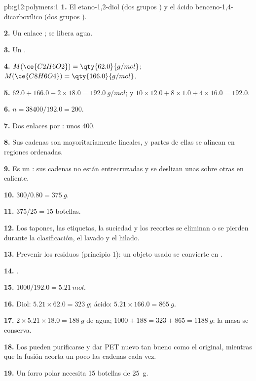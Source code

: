 \begin{solution}{pb:g12:polymers:1}
\textbf{1.} El etano-1,2-diol (dos grupos ) y el ácido
benceno-1,4-dicarboxílico (dos grupos ).

\textbf{2.} Un enlace ; se libera agua.

\textbf{3.} Un .

\textbf{4.} $M(\ce{C2H6O2}) = \qty{62.0}{g/mol}$; $M(\ce{C8H6O4}) =
\qty{166.0}{g/mol}$.

\textbf{5.} $62.0 + 166.0 - 2 \times 18.0 = \qty{192.0}{g/mol}$; y
$10 \times 12.0 + 8 \times 1.0 + 4 \times 16.0 = 192.0$.

\textbf{6.} $n = 38400/192.0 = 200$.

\textbf{7.} Dos enlaces  por : unos 400.

\textbf{8.} Sus cadenas son mayoritariamente lineales, y partes de ellas
se alinean en regiones ordenadas.

\textbf{9.} Es un : sus cadenas no están entrecruzadas y se
deslizan unas sobre otras en caliente.

\textbf{10.} $300/0.80 = \qty{375}{g}$.

\textbf{11.} $375/25 = 15$ botellas.

\textbf{12.} Los tapones, las etiquetas, la suciedad y los recortes se
eliminan o se pierden durante la clasificación, el lavado y el hilado.

\textbf{13.} Prevenir los residuos (principio 1): un objeto usado se
convierte en .

\textbf{14.} .

\textbf{15.} $1000/192.0 = \qty{5.21}{mol}$.

\textbf{16.} Diol: $5.21 \times 62.0 = \qty{323}{g}$; ácido:
$5.21 \times 166.0 = \qty{865}{g}$.

\textbf{17.} $2 \times 5.21 \times 18.0 = \qty{188}{g}$ de agua;
$1000 + 188 = 323 + 865 = \qty{1188}{g}$: la masa se conserva.

\textbf{18.} Los  pueden purificarse y dar PET nuevo tan bueno
como el original, mientras que la fusión acorta un poco las cadenas cada
vez.

\textbf{19.} Un forro polar necesita 15 botellas de \qty{25}{g}.
\end{solution}
